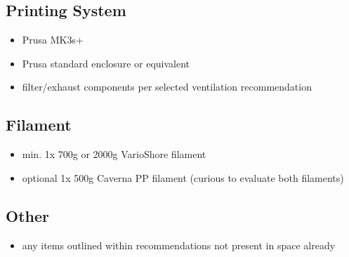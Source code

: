 \documentclass[11pt]{article}
\begin{document}
\subsection{Printing System}
\label{sec:org33fa47a}
\begin{itemize}
\item Prusa MK3s+
\item Prusa standard enclosure or equivalent
\item filter/exhaust components per selected ventilation recommendation
\end{itemize}

\subsection{Filament}
\label{sec:orgbc8201c}
\begin{itemize}
\item min. 1x 700g or 2000g VarioShore filament
\item optional 1x 500g Caverna PP filament (curious to evaluate both filaments)
\end{itemize}

\subsection{Other}
\label{sec:orbc8201c}
\begin{itemize}
\item any items outlined within recommendations not present in space already
\end{itemize}
\end{document}
